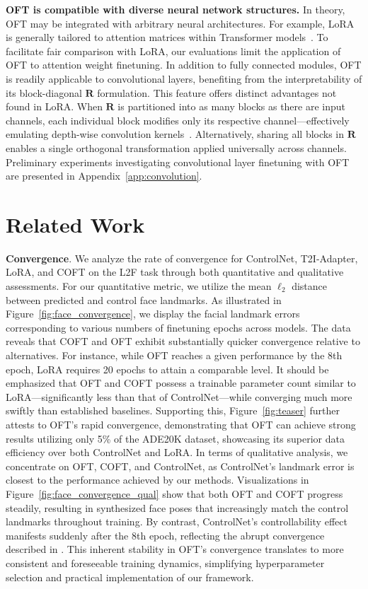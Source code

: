 \begin{itemize}[leftmargin=*,nosep]
\begin{itemize}[leftmargin=*,nosep]
\textbf{OFT is compatible with diverse neural network structures.} In theory, OFT may be integrated with arbitrary neural architectures. For example, LoRA is generally tailored to attention matrices within Transformer models~\cite{hulora2022}. To facilitate fair comparison with LoRA, our evaluations limit the application of OFT to attention weight finetuning. In addition to fully connected modules, OFT is readily applicable to convolutional layers, benefiting from the interpretability of its block-diagonal $\bm{R}$ formulation. This feature offers distinct advantages not found in LoRA. When $\bm{R}$ is partitioned into as many blocks as there are input channels, each individual block modifies only its respective channel—effectively emulating depth-wise convolution kernels~\cite{chollet2017xception}. Alternatively, sharing all blocks in $\bm{R}$ enables a single orthogonal transformation applied universally across channels. Preliminary experiments investigating convolutional layer finetuning with OFT are presented in Appendix~\ref{app:convolution}.

\section{Related Work}

\textbf{Convergence}. We analyze the rate of convergence for ControlNet, T2I-Adapter, LoRA, and COFT on the L2F task through both quantitative and qualitative assessments. For our quantitative metric, we utilize the mean $\ell_2$ distance between predicted and control face landmarks. As illustrated in Figure~\ref{fig:face_convergence}, we display the facial landmark errors corresponding to various numbers of finetuning epochs across models. The data reveals that COFT and OFT exhibit substantially quicker convergence relative to alternatives. For instance, while OFT reaches a given performance by the 8th epoch, LoRA requires 20 epochs to attain a comparable level. It should be emphasized that OFT and COFT possess a trainable parameter count similar to LoRA—significantly less than that of ControlNet—while converging much more swiftly than established baselines. Supporting this, Figure~\ref{fig:teaser} further attests to OFT’s rapid convergence, demonstrating that OFT can achieve strong results utilizing only 5\% of the ADE20K dataset, showcasing its superior data efficiency over both ControlNet and LoRA. In terms of qualitative analysis, we concentrate on OFT, COFT, and ControlNet, as ControlNet’s landmark error is closest to the performance achieved by our methods. Visualizations in Figure~\ref{fig:face_convergence_qual} show that both OFT and COFT progress steadily, resulting in synthesized face poses that increasingly match the control landmarks throughout training. By contrast, ControlNet’s controllability effect manifests suddenly after the 8th epoch, reflecting the abrupt convergence described in \cite{zhang2023adding}. This inherent stability in OFT’s convergence translates to more consistent and foreseeable training dynamics, simplifying hyperparameter selection and practical implementation of our framework.


\end{itemize}
\end{itemize}
